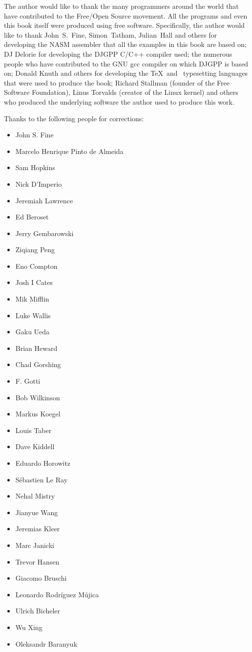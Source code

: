 The author would like to thank the many programmers around the world
that have contributed to the Free/Open Source movement. All the
programs and even this book itself were produced using free
software. Specifically, the author would like to thank John~S.~Fine,
Simon~Tatham, Julian~Hall and others for developing the NASM assembler
that all the examples in this book are based on; DJ Delorie for
developing the DJGPP C/C++ compiler used; the numerous people who have
contributed to the GNU gcc compiler on which DJGPP is based on; Donald
Knuth and others for developing the \TeX\ and \LaTeXe\ typesetting
languages that were used to produce the book; Richard Stallman
(founder of the Free Software Foundation), Linus Torvalds (creator of
the Linux kernel) and others who produced the underlying software the
author used to produce this work.

Thanks to the following people for corrections:
\begin{itemize}
\item John S. Fine
\item Marcelo Henrique Pinto de Almeida
\item Sam Hopkins
\item Nick D'Imperio
\item Jeremiah Lawrence
\item Ed Beroset
\item Jerry Gembarowski
\item Ziqiang Peng
\item Eno Compton
\item Josh I Cates
\item Mik Mifflin
\item Luke Wallis
\item Gaku Ueda
\item Brian Heward
\item Chad Gorshing
\item F. Gotti
\item Bob Wilkinson
\item Markus Koegel
\item Louis Taber
\item Dave Kiddell
\item Eduardo Horowitz
\item S\'{e}bastien Le Ray
\item Nehal Mistry
\item Jianyue Wang
\item Jeremias Kleer
\item Marc Janicki
\item Trevor Hansen
\item Giacomo Bruschi
\item Leonardo Rodr\'{i}guez M\'{u}jica
\item Ulrich Bicheler
\item Wu Xing
\item Oleksandr Baranyuk
\end{itemize}


